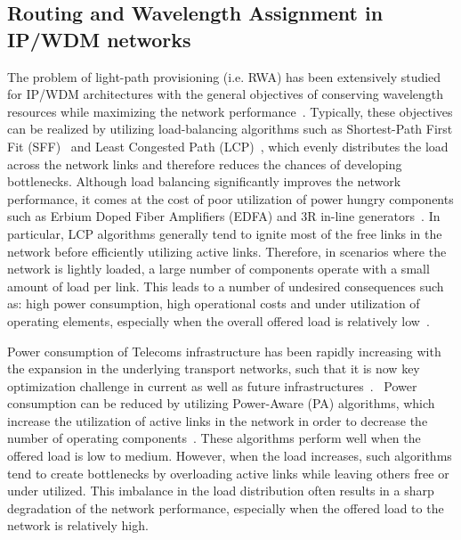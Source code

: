 \documentclass[journal]{IEEEtran}
\begin{document}
\subsection{Routing and Wavelength Assignment in IP/WDM networks}\label{rwa:ip}
The problem of light-path provisioning (i.e. RWA) has been extensively studied for IP/WDM architectures with the general objectives of conserving wavelength resources while maximizing the network performance~\cite{raj:alloptic,zan:alloptic,and:rwa,ram:rwa,ban:rwa}.
Typically, these objectives can be realized by utilizing load-balancing algorithms such as Shortest-Path First Fit (SFF)~\cite{dij:rwa} and Least Congested Path (LCP)~\cite{zan:alloptic,ozd:rwa,cha:rwa,chu:rwa}, which evenly distributes the load across the network links and therefore reduces the chances of developing bottlenecks.
Although load balancing significantly improves the network performance, it comes at the cost 
of poor utilization of power hungry components such as Erbium Doped Fiber Amplifiers (EDFA) and 3R in-line generators~\cite{coi:alloptic}.
In particular, LCP algorithms generally tend to ignite most of the free links in the network before efficiently utilizing active links. Therefore, in scenarios where the network is lightly loaded, a large number of components operate with a small amount of load per link. This leads to a number of undesired consequences such as: high power consumption, high operational costs and under utilization of operating elements, especially when the overall offered load is relatively low~\cite{coi:alloptic}. 

Power consumption of Telecoms infrastructure has been rapidly
increasing with the expansion in the underlying transport networks,
such that it is now key optimization challenge in current as well as future infrastructures~\cite{mud:pow,zha:pow}. 
~Power consumption can be reduced by utilizing Power-Aware (PA) algorithms, which increase the utilization of active links in the network in order to decrease the number of operating components~\cite{yon:rwa,coi2:rwa}.
These algorithms perform well when the offered load is low to medium. However, when the load increases, such algorithms tend to create bottlenecks by overloading active links while leaving others free or under utilized. This imbalance in the load distribution often results in a sharp degradation of the network performance, especially when the offered load to the network is relatively high. 
\end{document}
